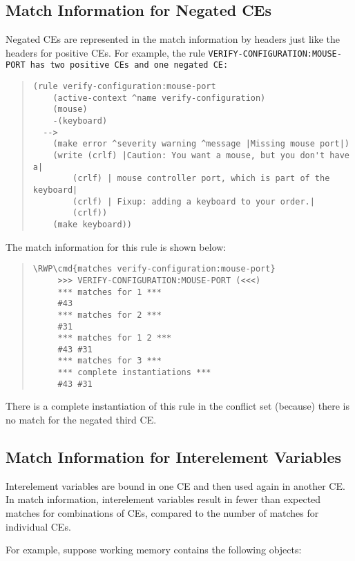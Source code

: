\subsection{Match Information for Negated CEs}

Negated CEs are represented in the match information by headers just
like the headers for positive CEs. For example, the rule
\tt{VERIFY-CONFIGURATION:MOUSE-PORT} has two positive CEs and one
negated CE:

\begin{quote}
\begin{verbatim}
(rule verify-configuration:mouse-port
    (active-context ^name verify-configuration)
    (mouse)
    -(keyboard)
  -->
    (make error ^severity warning ^message |Missing mouse port|)
    (write (crlf) |Caution: You want a mouse, but you don't have a|
        (crlf) | mouse controller port, which is part of the keyboard|
        (crlf) | Fixup: adding a keyboard to your order.|
        (crlf))
    (make keyboard))
\end{verbatim}
\end{quote}

The match information for this rule is shown below:

\begin{quote}
\begin{Verbatim}[commandchars=\\\{\}]
\RWP\cmd{matches verify-configuration:mouse-port}
     >>> VERIFY-CONFIGURATION:MOUSE-PORT (<<<)
     *** matches for 1 ***
     #43
     *** matches for 2 ***
     #31
     *** matches for 1 2 ***
     #43 #31
     *** matches for 3 ***
     *** complete instantiations ***
     #43 #31
\end{Verbatim}
\end{quote}

There is a complete instantiation of this rule in the conflict set
(because) there is no match for the negated third CE.

\subsection{Match Information for Interelement Variables}

Interelement variables are bound in one CE and then used again in
another CE. In match information, interelement variables result in
fewer than expected matches for combinations of CEs, compared to the
number of matches for individual CEs.

For example, suppose working memory contains the following objects:

